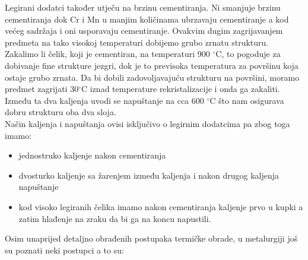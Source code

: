 \documentclass[a4paper,12pt]{article}
\numberwithin{figure}{section}
\begin{document}
\FloatBarrier
Legirani dodatci također utječu na brzinu cementiranja. Ni smanjuje brzinu cementiranja dok Cr i Mn u manjim količinama ubrzavaju cementiranje a kod većeg sadržaja i oni usporavaju cementiranje. Ovakvim dugim zagrijavanjem predmeta na tako visokoj temperaturi dobijemo grubo zrnatu strukturu. Zakalimo li čelik, koji je cementiran, na temperaturi 900 $^{\circ}$C, to pogoduje za dobivanje fine strukture jezgri, dok je to previsoka temperatura za površinu koja ostaje grubo zrnata. Da bi dobili zadovoljavajuću strukturu na površini, moramo predmet zagrijati 30$^{\circ}$C iznad temperature rekristalizacije i onda ga zakaliti. Između ta dva kaljenja uvodi se napuštanje na cca 600 $^{\circ}$C što nam osigurava dobru strukturu oba dva sloja. \\
Način kaljenja i napuštanja ovisi isključivo o legirnim dodatcima pa zbog toga imamo:
\begin{itemize}
\item jednostruko kaljenje nakon cementiranja
\item dvosturko kaljenje sa žarenjem između kaljenja i nakon drugog kaljenja napuštanje
\item kod visoko legiranih čelika imamo nakon cementiranja kaljenje prvo u kupki a zatim hlađenje na zraku da bi ga na koncu napustili.
\end{itemize}
Osim unaprijed detaljno obrađenih postupaka termičke obrade, u metalurgiji još su poznati neki postupci a to su:
\end{document}
